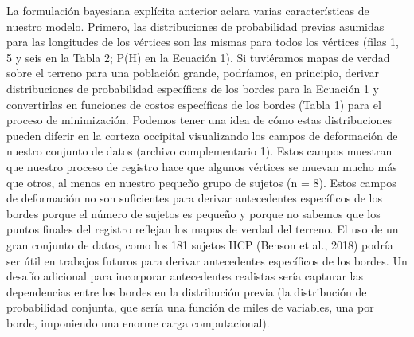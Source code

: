 La formulación bayesiana explícita anterior aclara varias características de nuestro modelo. Primero, las distribuciones de probabilidad previas asumidas para las longitudes de los vértices son las mismas para todos los vértices (filas 1, 5 y seis en la Tabla 2; P(H) en la Ecuación 1). Si tuviéramos mapas de verdad sobre el terreno para una población grande, podríamos, en principio, derivar distribuciones de probabilidad específicas de los bordes para la Ecuación 1 y convertirlas en funciones de costos específicas de los bordes (Tabla 1) para el proceso de minimización. Podemos tener una idea de cómo estas distribuciones pueden diferir en la corteza occipital visualizando los campos de deformación de nuestro conjunto de datos (archivo complementario 1). Estos campos muestran que nuestro proceso de registro hace que algunos vértices se muevan mucho más que otros, al menos en nuestro pequeño grupo de sujetos (n = 8). Estos campos de deformación no son suficientes para derivar antecedentes específicos de los bordes porque el número de sujetos es pequeño y porque no sabemos que los puntos finales del registro reflejan los mapas de verdad del terreno. El uso de un gran conjunto de datos, como los 181 sujetos HCP (Benson et al., 2018) podría ser útil en trabajos futuros para derivar antecedentes específicos de los bordes. Un desafío adicional para incorporar antecedentes realistas sería capturar las dependencias entre los bordes en la distribución previa (la distribución de probabilidad conjunta, que sería una función de miles de variables, una por borde, imponiendo una enorme carga computacional).

